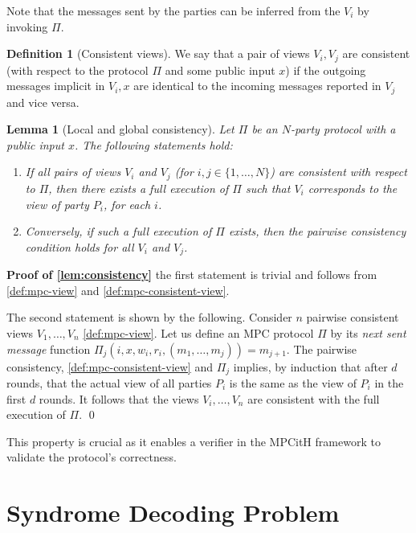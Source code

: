 \documentclass[11pt]{report}
\theoremstyle{definition}
\newtheorem{definition}{Definition}[section]
\theoremstyle{plain}
\newtheorem{lemma}{Lemma}[section]
\begin{document}
\noindent Note that the messages sent by the parties can be inferred from the $V_i$ by invoking $\Pi$.

\begin{definition}[Consistent views]\label{def:mpc-consistent-view}
  We say that a pair of views $V_i, V_j$ are consistent (with respect to the protocol $\Pi$ and some public input $x$) if the outgoing messages implicit in $V_i, x$ are identical to the incoming messages reported in $V_j$ and vice versa.
\end{definition}

\begin{lemma}[Local and global consistency]\label{lem:consistency}
  Let $\Pi$ be an $N$-party protocol with a public input $x$. The following statements hold:
  \begin{enumerate}
    \item If all pairs of views $V_i$ and $V_j$ (for $i, j \in \{1, \dots, N\}$) are consistent with respect to $\Pi$, then there exists a full execution of $\Pi$ such that $V_i$ corresponds to the view of party $P_i$, for each $i$.
    \item Conversely, if such a full execution of $\Pi$ exists, then the pairwise consistency condition holds for all $V_i$ and $V_j$.
  \end{enumerate}
\end{lemma}

\textbf{Proof of \autoref{lem:consistency}} the first statement is trivial and follows from \autoref{def:mpc-view} and \autoref{def:mpc-consistent-view}.

The second statement is shown by the following. Consider $n$ pairwise consistent views $V_1, \dots, V_n$ \autoref{def:mpc-view}. Let us define an MPC protocol $\Pi$ by its \textit{next sent message} function $\Pi_j(i,x,w_i,r_i, (m_1, \dots, m_j)) = m_{j+1}$. The pairwise consistency, \autoref{def:mpc-consistent-view} and $\Pi_j$ implies, by induction that after $d$ rounds, that the actual view of all parties $P_i$ is the same as the view of $P_i$ in the first $d$ rounds. It follows that the views $V_i, \dots, V_n$ are consistent with the full execution of $\Pi$. \qed

This property is crucial as it enables a verifier in the MPCitH framework to validate the protocol's correctness.

\section{Syndrome Decoding Problem}\label{sec:syndrome}
\end{document}
